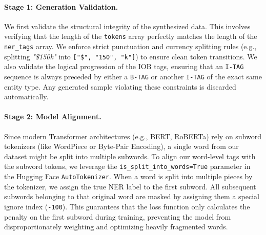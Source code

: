 \paragraph{Stage 1: Generation Validation.} We first validate the structural integrity of the synthesized data. This involves verifying that the length of the \texttt{tokens} array perfectly matches the length of the \texttt{ner\_tags} array. We enforce strict punctuation and currency splitting rules (e.g., splitting \textit{"\$150k"} into \texttt{["\$", "150", "k"]}) to ensure clean token transitions. We also validate the logical progression of the IOB tags, ensuring that an \texttt{I-TAG} sequence is always preceded by either a \texttt{B-TAG} or another \texttt{I-TAG} of the exact same entity type. Any generated sample violating these constraints is discarded automatically.

\paragraph{Stage 2: Model Alignment.} Since modern Transformer architectures (e.g., BERT, RoBERTa) rely on subword tokenizers (like WordPiece or Byte-Pair Encoding), a single word from our dataset might be split into multiple subwords. To align our word-level tags with the subword tokens, we leverage the \texttt{is\_split\_into\_words=True} parameter in the Hugging Face \texttt{AutoTokenizer}. When a word is split into multiple pieces by the tokenizer, we assign the true NER label to the first subword. All subsequent subwords belonging to that original word are masked by assigning them a special ignore index (\texttt{-100}). This guarantees that the loss function only calculates the penalty on the first subword during training, preventing the model from disproportionately weighting and optimizing heavily fragmented words.